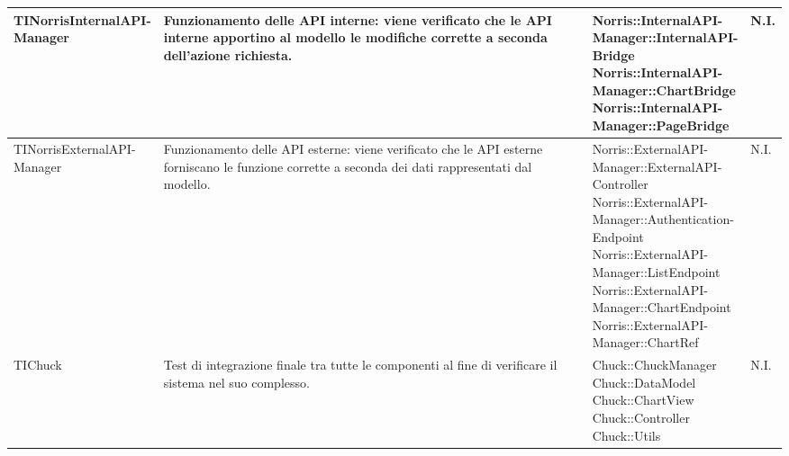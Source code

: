 \begin{longtabu}{| X | X | X[0.9] | X[0.3] |}
	\parbox[t]{0.6\textwidth}{TINorrisInternalAPI-\\Manager}
	&
Funzionamento delle API interne: viene verificato che le API interne apportino al modello le modifiche corrette a seconda dell'azione richiesta.
& \parbox[t]{0.6\textwidth}{
Norris::InternalAPI-\\Manager::InternalAPI-\\Bridge\\
Norris::InternalAPI-\\Manager::ChartBridge\\
Norris::InternalAPI-\\Manager::PageBridge}
			& N.I.
			\\ \hline



	\parbox[t]{0.6\textwidth}{TINorrisExternalAPI-\\Manager}
	&
Funzionamento delle API esterne: viene verificato che le API esterne forniscano le funzione corrette a seconda dei dati rappresentati dal modello.
& \parbox[t]{0.6\textwidth}{
Norris::ExternalAPI-\\Manager::ExternalAPI-\\Controller\\
Norris::ExternalAPI-\\Manager::Authentication-\\Endpoint\\
Norris::ExternalAPI-\\Manager::ListEndpoint\\
Norris::ExternalAPI-\\Manager::ChartEndpoint\\
Norris::ExternalAPI-\\Manager::ChartRef}
			& N.I.
			\\ \hline











	TIChuck
				&
Test di integrazione finale tra tutte le componenti al fine di verificare il sistema nel suo complesso.
			& \parbox[t]{0.6\textwidth}{
Chuck::ChuckManager\\
Chuck::DataModel\\
Chuck::ChartView\\
Chuck::Controller\\
Chuck::Utils}
			& N.I.
			\\ \hline




\end{longtabu}
